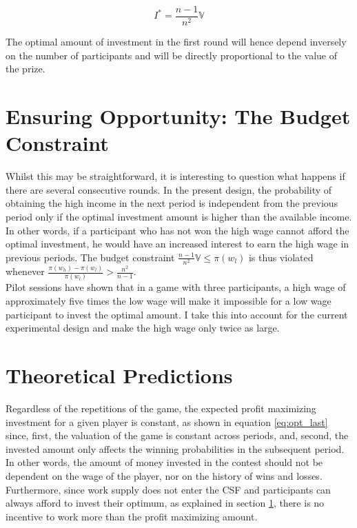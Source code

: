 \begin{equation}
    I^{*} = \frac{n-1}{n^2}\mathbb{V}
\label{eq:opt_last}
\end{equation}

\hfill \break 

The optimal amount of investment in the first round will hence depend inversely on the number of participants and will be directly proportional to the value of the prize.\\

\section{Ensuring Opportunity: The Budget Constraint}
\label{sec:budget_constraint}

Whilst this may be straightforward, it is interesting to question what happens if there are several consecutive rounds. In the present design, the probability of obtaining the high income in the next period is independent from the previous period only if the optimal investment amount is higher than the available income. In other words, if a participant who has not won the high wage cannot afford the optimal investment, he would have an increased interest to earn the high wage in previous periods. The budget constraint $\frac{n-1}{n^2}\mathbb{V} \leq \pi(w_l)$ is thus violated whenever $\frac{\pi(w_h)-\pi(w_l)}{\pi(w_l)} > \frac{n^2}{n-1}$.\\

Pilot sessions have shown that in a game with three participants, a high wage of approximately five times the low wage will make it impossible for a low wage participant to invest the optimal amount. I take this into account for the current experimental design and make the high wage only twice as large.

\section{Theoretical Predictions}

Regardless of the repetitions of the game, the expected profit maximizing investment for a given player is constant, as shown in equation \ref{eq:opt_last} since, first, the valuation of the game is constant across periods, and, second, the invested amount only affects the winning probabilities in the subsequent period. In other words, the amount of money invested in the contest should not be dependent on the wage of the player, nor on the history of wins and losses.\\

Furthermore, since work supply does not enter the CSF and participants can always afford to invest their optimum, as explained in section \ref{sec:budget_constraint}, there is no incentive to work more than the profit maximizing amount. 